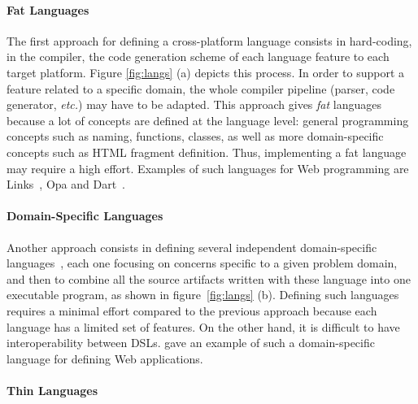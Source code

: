 \documentclass[preprint]{sigplanconf}
\newcommand{\etc}{\emph{etc.}}
\begin{document}
\paragraph{Fat Languages}

\enlargethispage{0.3cm}

The first approach for defining a cross-platform language consists in hard-coding, in the compiler,
the code generation scheme of each language feature to each target platform. Figure \ref{fig:langs}
(a) depicts this process. In order to support a feature related to a specific domain, the whole
compiler pipeline (parser, code generator, \etc) may have to be adapted. This approach gives
\emph{fat} languages because a lot of concepts are defined at the language level: general
programming concepts such as naming, functions, classes, as well as more domain-specific concepts
such as HTML fragment definition. Thus, implementing a fat language may require a high effort.
Examples of such languages for Web programming are Links~\cite{Cooper07_Links}, Opa and
Dart~\cite{Griffith11_Dart}.

\paragraph{Domain-Specific Languages}


Another approach consists in defining several independent domain-specific
languages~\cite{Van00_DSL}, each one focusing on concerns specific to a given problem domain, and
then to combine all the source artifacts written with these language into one executable program, as
shown in figure~\ref{fig:langs} (b). Defining such languages requires a minimal effort compared to
the previous approach because each language has a limited set of features. On the other hand, it is
difficult to have interoperability between DSLs. \cite{Visser07} gave an example of such
a domain-specific language for defining Web applications.

\paragraph{Thin Languages}

\enlargethispage{0.3cm}

\end{document}

